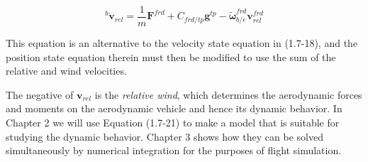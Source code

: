 \begin{equation*}\tag{1.7-21}
    {^{b}{\dot{\mathbf{v}}_{rel}}} = \textstyle{\frac{1}{m}}{\mathbf{F}^{frd}} + {C_{frd/tp}}{\mathbf{g}^{tp}} - \tilde{\mathbf{\omega}}^{frd}_{b/e} \mathbf{v}^{frd}_{rel}
\end{equation*}

This equation is an alternative to the velocity state equation in (1.7-18), and the position state equation therein must then be modified to use the sum of the relative and wind velocities.

The negative of \(\mathbf{v}_{rel}\) is the \emph{relative wind}, which determines the aerodynamic forces and moments on the aerodynamic vehicle and hence its dynamic behavior. In Chapter 2 we will use Equation (1.7-21) to make a model that is suitable for studying the dynamic behavior. Chapter 3 shows how they can be solved simultaneously by numerical integration for the purposes of flight simulation.
